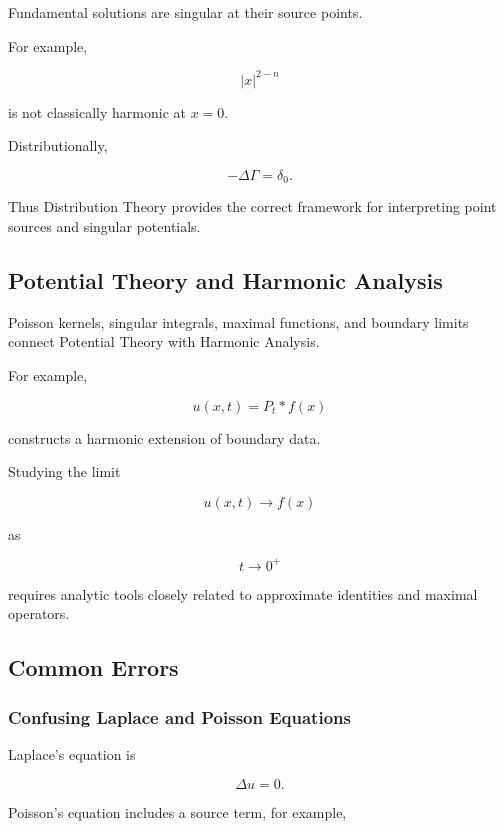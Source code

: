 Fundamental solutions are singular at their source points.

For example,

\[
|x|^{2-n}
\]

is not classically harmonic at \(x=0\).

Distributionally,

\[
\boxed{
-\Delta\Gamma=\delta_0.
}
\]

Thus Distribution Theory provides the correct framework for interpreting
point sources and singular potentials.

\subsection{Potential Theory and Harmonic Analysis}
\label{subsec:potential-harmonic-analysis}

Poisson kernels, singular integrals, maximal functions, and boundary
limits connect Potential Theory with Harmonic Analysis.

For example,

\[
u(x,t)
=
P_t*f(x)
\]

constructs a harmonic extension of boundary data.

Studying the limit

\[
u(x,t)\to f(x)
\]

as

\[
t\to0^+
\]

requires analytic tools closely related to approximate identities and
maximal operators.

\subsection{Common Errors}
\label{subsec:potential-theory-common-errors}

\subsubsection{Confusing Laplace and Poisson Equations}

Laplace's equation is

\[
\boxed{
\Delta u=0.
}
\]

Poisson's equation includes a source term, for example,

